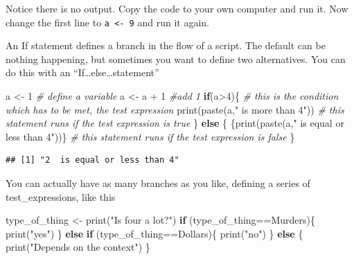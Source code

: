 \documentclass[
]{book}
\newenvironment{Shaded}{\begin{snugshade}}{\end{snugshade}}
\newcommand{\CommentTok}[1]{\textcolor[rgb]{0.56,0.35,0.01}{\textit{#1}}}
\newcommand{\ControlFlowTok}[1]{\textcolor[rgb]{0.13,0.29,0.53}{\textbf{#1}}}
\newcommand{\DecValTok}[1]{\textcolor[rgb]{0.00,0.00,0.81}{#1}}
\newcommand{\FunctionTok}[1]{\textcolor[rgb]{0.00,0.00,0.00}{#1}}
\newcommand{\NormalTok}[1]{#1}
\newcommand{\OtherTok}[1]{\textcolor[rgb]{0.56,0.35,0.01}{#1}}
\newcommand{\SpecialCharTok}[1]{\textcolor[rgb]{0.00,0.00,0.00}{#1}}
\newcommand{\StringTok}[1]{\textcolor[rgb]{0.31,0.60,0.02}{#1}}
\begin{document}
Notice there is no output. Copy the code to your own computer and run it. Now change the first line to \texttt{a\ \textless{}-\ 9} and run it again.

An If statement defines a branch in the flow of a script. The default can be nothing happening, but sometimes you want to define two alternatives. You can do this with an ``If\ldots else\ldots statement''

\begin{Shaded}
\begin{Highlighting}[]
\NormalTok{a }\OtherTok{\textless{}{-}} \DecValTok{1} \CommentTok{\# define a variable}
\NormalTok{a }\OtherTok{\textless{}{-}}\NormalTok{ a }\SpecialCharTok{+} \DecValTok{1} \CommentTok{\#add 1}
\ControlFlowTok{if}\NormalTok{(a}\SpecialCharTok{\textgreater{}}\DecValTok{4}\NormalTok{)\{ }\CommentTok{\# this is the condition which has to be met, the \textquotesingle{}test expression\textquotesingle{}}
  \FunctionTok{print}\NormalTok{(}\FunctionTok{paste}\NormalTok{(a,}\StringTok{" is more than 4"}\NormalTok{)) }\CommentTok{\# this statement runs if the test expression is true}
\NormalTok{\} }\ControlFlowTok{else}\NormalTok{ \{}
\NormalTok{  \{}\FunctionTok{print}\NormalTok{(}\FunctionTok{paste}\NormalTok{(a,}\StringTok{" is equal or less than 4"}\NormalTok{))\} }\CommentTok{\# this statement runs if the test expression is false}
\NormalTok{\}}
\end{Highlighting}
\end{Shaded}

\begin{verbatim}
## [1] "2  is equal or less than 4"
\end{verbatim}

You can actually have as many branches as you like, defining a series of test\_expressions, like this

\begin{Shaded}
\begin{Highlighting}[]
\NormalTok{type\_of\_thing }\OtherTok{\textless{}{-}} \StringTok{\textquotesingle{}\textquotesingle{}} 
\FunctionTok{print}\NormalTok{(}\StringTok{"Is four a lot?"}\NormalTok{)}
\ControlFlowTok{if}\NormalTok{ (type\_of\_thing}\SpecialCharTok{==}\StringTok{\textquotesingle{}Murders\textquotesingle{}}\NormalTok{)\{}
  \FunctionTok{print}\NormalTok{(}\StringTok{"yes"}\NormalTok{)}
\NormalTok{\} }\ControlFlowTok{else} \ControlFlowTok{if}\NormalTok{ (type\_of\_thing}\SpecialCharTok{==}\StringTok{\textquotesingle{}Dollars\textquotesingle{}}\NormalTok{)\{}
  \FunctionTok{print}\NormalTok{(}\StringTok{"no"}\NormalTok{)}
\NormalTok{\} }\ControlFlowTok{else}\NormalTok{ \{}
  \FunctionTok{print}\NormalTok{(}\StringTok{"Depends on the context"}\NormalTok{)}
\NormalTok{\}}
\end{Highlighting}
\end{Shaded}
\end{document}
